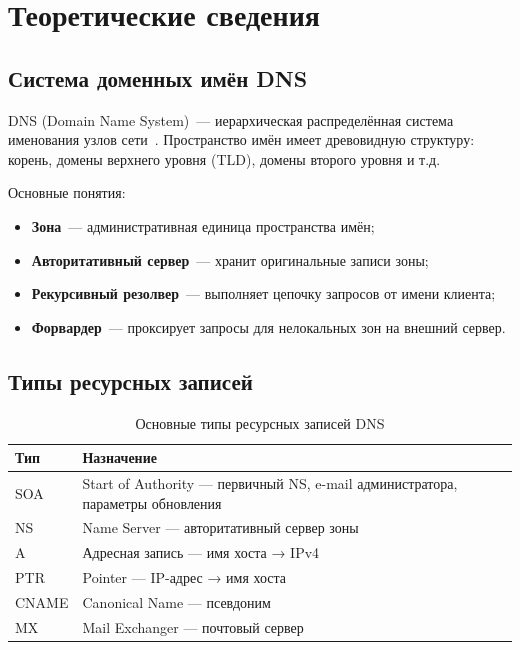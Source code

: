 \section{Теоретические сведения}

\subsection{Система доменных имён DNS}

DNS (Domain Name System)~--- иерархическая распределённая система именования узлов сети~\cite{rfc1034}. Пространство имён имеет древовидную структуру: корень, домены верхнего уровня (TLD), домены второго уровня и т.д.

Основные понятия:
\begin{itemize}
  \item \textbf{Зона}~--- административная единица пространства имён;
  \item \textbf{Авторитативный сервер}~--- хранит оригинальные записи зоны;
  \item \textbf{Рекурсивный резолвер}~--- выполняет цепочку запросов от имени клиента;
  \item \textbf{Форвардер}~--- проксирует запросы для нелокальных зон на внешний сервер.
\end{itemize}

\subsection{Типы ресурсных записей}

\begin{table}[h]
\caption{Основные типы ресурсных записей DNS}
\begin{tabular}{|l|p{10cm}|}
\hline
\textbf{Тип} & \textbf{Назначение} \\
\hline
SOA   & Start of Authority --- первичный NS, e-mail администратора, параметры обновления \\
\hline
NS    & Name Server --- авторитативный сервер зоны \\
\hline
A     & Адресная запись --- имя хоста → IPv4 \\
\hline
PTR   & Pointer --- IP-адрес → имя хоста \\
\hline
CNAME & Canonical Name --- псевдоним \\
\hline
MX    & Mail Exchanger --- почтовый сервер \\
\hline
\end{tabular}
\end{table}

